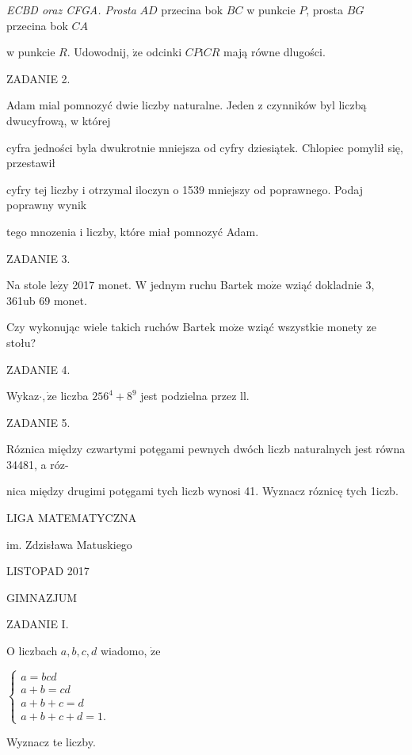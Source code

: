 \documentclass[a4paper,12pt]{article}
\begin{document}
{\it ECBD oraz CFGA. Prosta} $AD$ przecina bok $BC$ w punkcie $P$, prosta $BG$ przecina bok $CA$

w punkcie $R$. Udowodnij, $\dot{\mathrm{z}}\mathrm{e}$ odcinki $CP\mathrm{i}CR$ mają równe dlugości.

ZADANIE 2.

Adam mial pomnozyć dwie liczby naturalne. Jeden z czynników byl liczbą dwucyfrową, w której

cyfra jedności byla dwukrotnie mniejsza od cyfry dziesiątek. Chlopiec pomylił się, przestawił

cyfry tej liczby i otrzymal iloczyn o 1539 mniejszy od poprawnego. Podaj poprawny wynik

tego mnozenia i liczby, które miał pomnozyć Adam.

ZADANIE 3.

Na stole $\mathrm{l}\mathrm{e}\dot{\mathrm{z}}\mathrm{y}$ 2017 monet. $\mathrm{W}$ jednym ruchu Bartek $\mathrm{m}\mathrm{o}\dot{\mathrm{z}}\mathrm{e}$ wziąć dokladnie 3, 361ub 69 monet.

Czy wykonując wiele takich ruchów Bartek $\mathrm{m}\mathrm{o}\dot{\mathrm{z}}\mathrm{e}$ wziąć wszystkie monety ze stołu?

ZADANIE 4.

Wykaz$\cdot, \dot{\mathrm{z}}\mathrm{e}$ liczba $256^{4}+8^{9}$ jest podzielna przez ll.

ZADANIE 5.

Róznica między czwartymi potęgami pewnych dwóch liczb naturalnych jest równa 34481, a róz-

nica między drugimi potęgami tych liczb wynosi 41. Wyznacz róznicę tych 1iczb.






LIGA MATEMATYCZNA

im. Zdzisława Matuskiego

LISTOPAD 2017

GIMNAZJUM

ZADANIE I.

$\mathrm{O}$ liczbach $a, b, c, d$ wiadomo, $\dot{\mathrm{z}}\mathrm{e}$

$\left\{\begin{array}{l}
a=bcd\\
a+b=cd\\
a+b+c=d\\
a+b+c+d=1.
\end{array}\right.$

Wyznacz te liczby.
\end{document}
